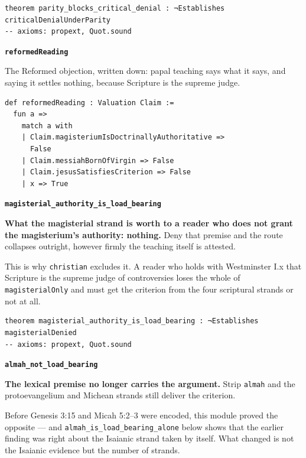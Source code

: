 \documentclass[11pt]{article}
\begin{document}
{\small\begin{verbatim}
theorem parity_blocks_critical_denial : ¬Establishes criticalDenialUnderParity
-- axioms: propext, Quot.sound
\end{verbatim}}
\par\medskip\noindent\textbf{\texttt{reformed\allowbreak{}Reading}}\par\nobreak\noindent
The Reformed objection, written down: papal teaching says what it says, and saying it settles nothing, because Scripture is the supreme judge.

{\small\begin{verbatim}
def reformedReading : Valuation Claim :=
  fun a =>
    match a with
    | Claim.magisteriumIsDoctrinallyAuthoritative =>
      False
    | Claim.messiahBornOfVirgin => False
    | Claim.jesusSatisfiesCriterion => False
    | x => True
\end{verbatim}}
\par\medskip\noindent\textbf{\texttt{magisterial\_\allowbreak{}authority\_\allowbreak{}is\_\allowbreak{}load\_\allowbreak{}bearing}}\par\nobreak\noindent
\textbf{What the magisterial strand is worth to a reader who does not grant the magisterium's authority: nothing.} Deny that premise and the route collapses outright, however firmly the teaching itself is attested.

This is why \texttt{christian} excludes it. A reader who holds with Westminster I.x that Scripture is the supreme judge of controversies loses the whole of \texttt{magisterial\allowbreak{}Only} and must get the criterion from the four scriptural strands or not at all.

{\small\begin{verbatim}
theorem magisterial_authority_is_load_bearing : ¬Establishes magisterialDenied
-- axioms: propext, Quot.sound
\end{verbatim}}
\par\medskip\noindent\textbf{\texttt{almah\_\allowbreak{}not\_\allowbreak{}load\_\allowbreak{}bearing}}\par\nobreak\noindent
\textbf{The lexical premise no longer carries the argument.} Strip \texttt{almah} and the protoevangelium and Michean strands still deliver the criterion.

Before Genesis 3:15 and Micah 5:2–3 were encoded, this module proved the opposite — and \texttt{almah\_\allowbreak{}is\_\allowbreak{}load\_\allowbreak{}bearing\_\allowbreak{}alone} below shows that the earlier finding was right about the Isaianic strand taken by itself. What changed is not the Isaianic evidence but the number of strands.
\end{document}
